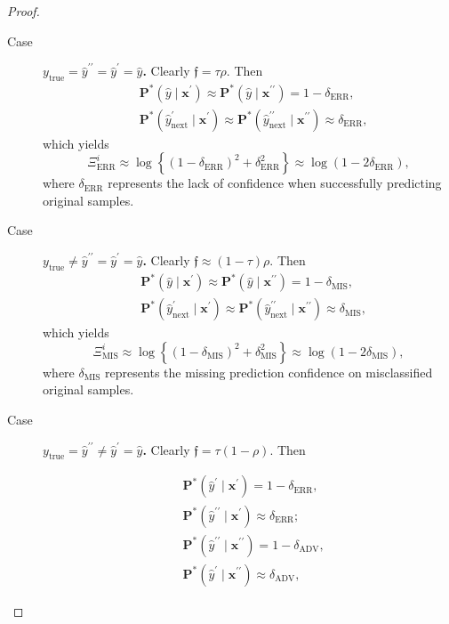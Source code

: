 \begin{proof}
    \begin{description}
        \item[Case] $y_{\text{true}} = \hat{y}^{\prime \prime} = \hat{y}^{\prime} = \hat{y}$\textbf{.} Clearly 
        $\mathfrak{f} = \tau \rho$. Then
        $$
        \begin{aligned}
            & \mathbf{P}^{*}(\hat{y} \mid \bm{x}^\prime) \approx \mathbf{P}^{*}(\hat{y} \mid \bm{x}^{\prime \prime}) = 1 - \delta_{\text{ERR}}, \\
            & \mathbf{P}^{*}(\hat{y}_{\text{next}}^{\prime}  \mid \bm{x}^\prime) \approx \mathbf{P}^{*}(\hat{y}_{\text{next}}^{\prime \prime}  \mid \bm{x}^{\prime \prime}) \approx \delta_{\text{ERR}},
        \end{aligned}
        $$
        which yields
        $$
        \Xi_{\text{ERR}}^i \approx \log \left\{ \left(1 - \delta_{\text{ERR}} \right)^2 +  \delta_{\text{ERR}}^ 2 \right\} \approx \log \left( 1 - 2\delta_{\text{ERR}} \right) ,
        $$
        where $\delta_{\text{ERR}}$ represents the lack of confidence when successfully predicting original samples.
        
        \item[Case]$y_{\text{true}} \neq \hat{y}^{\prime \prime} = \hat{y}^{\prime} = \hat{y}$\textbf{.} Clearly $\mathfrak{f} \approx (1 - \tau)\rho$. Then
        $$
        \begin{aligned}
            & \mathbf{P}^{*}(\hat{y} \mid \bm{x}^\prime) \approx \mathbf{P}^{*}(\hat{y} \mid \bm{x}^{\prime \prime}) = 1 - \delta_{\text{MIS}}, \\
            & \mathbf{P}^{*}(\hat{y}_{\text{next}}^{\prime}  \mid \bm{x}^\prime) \approx \mathbf{P}^{*}(\hat{y}_{\text{next}}^{\prime \prime}  \mid \bm{x}^{\prime \prime}) \approx \delta_{\text{MIS}},
        \end{aligned}
        $$
        which yields
        $$
        \Xi_{\text{MIS}}^i \approx \log \left\{ \left(1 - \delta_{\text{MIS}} \right)^2 +  \delta_{\text{MIS}}^ 2 \right\} \approx \log \left( 1 - 2\delta_{\text{MIS}} \right) ,
        $$
        where $\delta_{\text{MIS}}$ represents the missing prediction confidence on misclassified original samples.

        \item[Case]$y_{\text{true}} = \hat{y}^{\prime \prime} \neq \hat{y}^{\prime} = \hat{y}$\textbf{.} Clearly 
        $\mathfrak{f} = \tau (1-\rho)$. Then
        
        $$
        \begin{aligned}
            & \mathbf{P}^{*}(\hat{y}^\prime \mid \bm{x}^\prime) = 1 - \delta_{\text{ERR}},  \\
            & \mathbf{P}^{*}(\hat{y}^{\prime \prime} \mid \bm{x}^\prime) \approx \delta_{\text{ERR}}; \\
            & \mathbf{P}^{*}(\hat{y}^{\prime \prime} \mid \bm{x}^{\prime \prime}) = 1 - \delta_{\text{ADV}}, \\
            & \mathbf{P}^{*}(\hat{y}^{\prime} \mid \bm{x}^{\prime \prime}) \approx \delta_{\text{ADV}},
        \end{aligned}
        $$


\end{description}
\end{proof}
